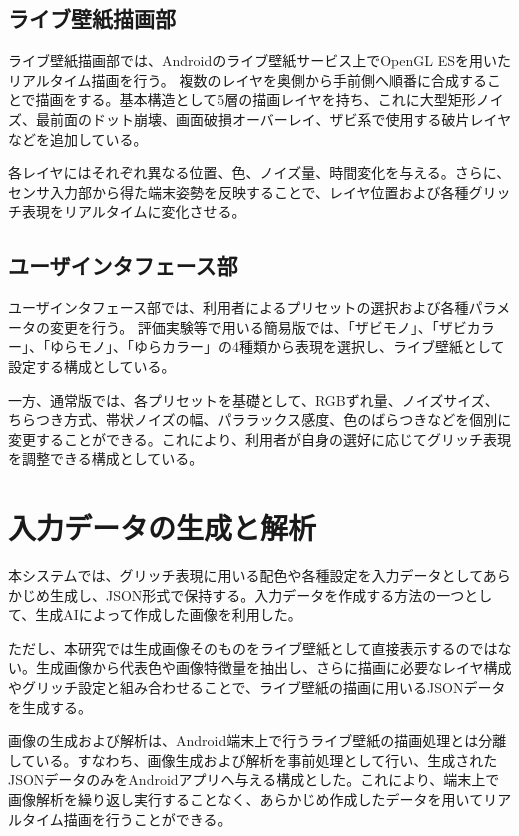 \subsection{ライブ壁紙描画部}

ライブ壁紙描画部では、Androidのライブ壁紙サービス上でOpenGL ESを用いたリアルタイム描画を行う。
複数のレイヤを奥側から手前側へ順番に合成することで描画をする。基本構造として5層の描画レイヤを持ち、これに大型矩形ノイズ、最前面のドット崩壊、画面破損オーバーレイ、ザビ系で使用する破片レイヤなどを追加している。

各レイヤにはそれぞれ異なる位置、色、ノイズ量、時間変化を与える。さらに、センサ入力部から得た端末姿勢を反映することで、レイヤ位置および各種グリッチ表現をリアルタイムに変化させる。


\subsection{ユーザインタフェース部}

ユーザインタフェース部では、利用者によるプリセットの選択および各種パラメータの変更を行う。
評価実験等で用いる簡易版では、「ザビモノ」、「ザビカラー」、「ゆらモノ」、「ゆらカラー」の4種類から表現を選択し、ライブ壁紙として設定する構成としている。

一方、通常版では、各プリセットを基礎として、RGBずれ量、ノイズサイズ、ちらつき方式、帯状ノイズの幅、パララックス感度、色のばらつきなどを個別に変更することができる。これにより、利用者が自身の選好に応じてグリッチ表現を調整できる構成としている。

\section{入力データの生成と解析}

本システムでは、グリッチ表現に用いる配色や各種設定を入力データとしてあらかじめ生成し、JSON形式で保持する。入力データを作成する方法の一つとして、生成AIによって作成した画像を利用した。

ただし、本研究では生成画像そのものをライブ壁紙として直接表示するのではない。生成画像から代表色や画像特徴量を抽出し、さらに描画に必要なレイヤ構成やグリッチ設定と組み合わせることで、ライブ壁紙の描画に用いるJSONデータを生成する。

画像の生成および解析は、Android端末上で行うライブ壁紙の描画処理とは分離している。すなわち、画像生成および解析を事前処理として行い、生成されたJSONデータのみをAndroidアプリへ与える構成とした。これにより、端末上で画像解析を繰り返し実行することなく、あらかじめ作成したデータを用いてリアルタイム描画を行うことができる。

